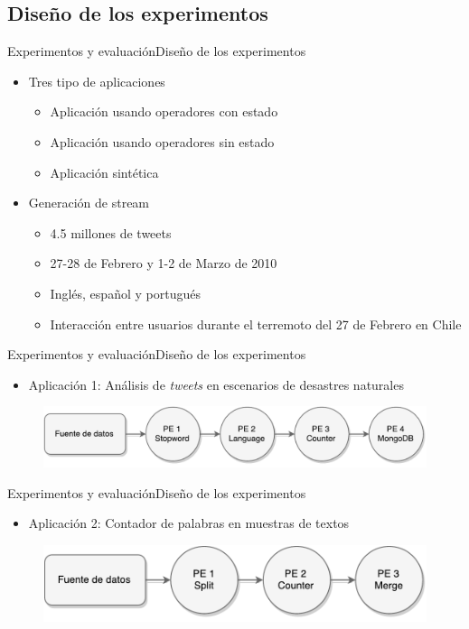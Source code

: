 \subsection*{Diseño de los experimentos}
\begin{frame}{Experimentos y evaluación}{Diseño de los experimentos}
\begin{itemize}
\item Tres tipo de aplicaciones
	\begin{itemize}
		\item Aplicación usando operadores con estado
		\item Aplicación usando operadores sin estado
		\item Aplicación sintética
	\end{itemize}
\item Generación de stream
\begin{itemize}
	\item 4.5 millones de tweets
	\item 27-28 de Febrero y 1-2 de Marzo de 2010
	\item Inglés, español y portugués
	\item Interacción entre usuarios durante el terremoto del 27 de Febrero en Chile
\end{itemize}
\end{itemize}
\end{frame}

\begin{frame}{Experimentos y evaluación}{Diseño de los experimentos}
\begin{itemize}
	\item Aplicación 1: Análisis de \textit{tweets} en escenarios de desastres naturales
\end{itemize}
\begin{figure}[!hb]
	\centering
		\includegraphics[scale=0.55]{images/App1.pdf}
\end{figure}
\end{frame}

\begin{frame}{Experimentos y evaluación}{Diseño de los experimentos}
\begin{itemize}
	\item Aplicación 2: Contador de palabras en muestras de textos
\end{itemize}
\begin{figure}[!ht]
	\centering
		\includegraphics[scale=0.65]{images/App2.pdf}
	\label{fig:segundaAplicacion}
\end{figure}
\end{frame}

